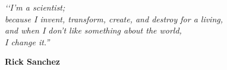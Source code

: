 \begin{epigrafe}
    \vspace*{\fill}
    \begin{flushright}
        \vspace{\onelineskip}
        \textit{‘‘I'm a scientist; \\because I invent, transform, create, and destroy for a living, \\and when I don't like something about the world, \\I change it.''\\}
        \vspace{\onelineskip}
        {\bfseries
        Rick Sanchez
        \par}
    \end{flushright}
\end{epigrafe}
